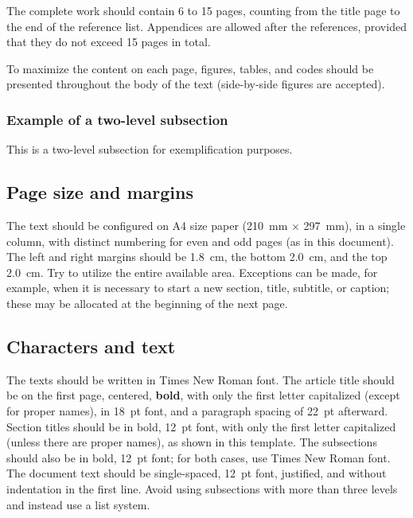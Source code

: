 The complete work should contain 6 to 15 pages, counting from the title page to the end of the reference list. Appendices are allowed after the references, provided that they do not exceed 15 pages in total.

To maximize the content on each page, figures, tables, and codes should be presented throughout the body of the text (side-by-side figures are accepted).

\subsubsection{Example of a two-level subsection}

This is a two-level subsection for exemplification purposes.

\subsection{Page size and margins}

The text should be configured on A4 size paper (210~mm $\times$ 297~mm), in a single column, with distinct numbering for even and odd pages (as in this document). The left and right margins should be 1.8~cm, the bottom 2.0~cm, and the top 2.0~cm. Try to utilize the entire available area. Exceptions can be made, for example, when it is necessary to start a new section, title, subtitle, or caption; these may be allocated at the beginning of the next page.

\subsection{Characters and text}

The texts should be written in Times New Roman font. The article title should be on the first page, centered, \textbf{bold}, with only the first letter capitalized (except for proper names), in 18~pt font, and a paragraph spacing of 22~pt afterward. Section titles should be in bold, 12~pt font, with only the first letter capitalized (unless there are proper names), as shown in this template. The subsections should also be in bold, 12~pt font; for both cases, use Times New Roman font. The document text should be single-spaced, 12~pt font, justified, and without indentation in the first line. Avoid using subsections with more than three levels and instead use a list system.

